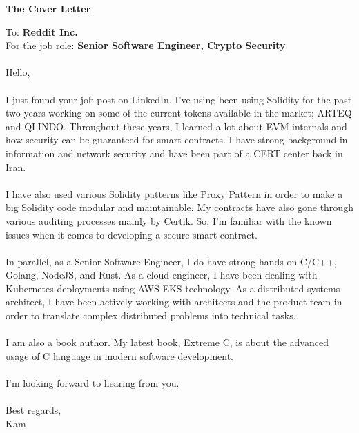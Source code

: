 \documentclass[10pt,a4paper]{article}
\begin{document}
\noindent \textbf{The Cover Letter}

\vspace{3cm}

\noindent To: \textbf{Reddit Inc.} \\
For the job role: \textbf{Senior Software Engineer, Crypto Security} \\ \\

\noindent Hello, \\ \\

\noindent I just found your job post on LinkedIn. I've using been using Solidity for the past two years working on some of the current tokens available in the market; ARTEQ and QLINDO. Throughout these years, I learned a lot about EVM internals and how security can be guaranteed for smart contracts. I have strong background in information and network security and have been part of a CERT center back in Iran. \\ \\

\noindent I have also used various Solidity patterns like Proxy Pattern in order to make a big Solidity code modular and maintainable. My contracts have also gone through various auditing processes mainly by Certik. So, I'm familiar with the known issues when it comes to developing a secure smart contract. \\ \\

\noindent In parallel, as a Senior Software Engineer, I do have strong hands-on C/C++, Golang, NodeJS, and Rust. As a cloud engineer, I have been dealing with Kubernetes deployments using AWS EKS technology. As a distributed systems architect, I have been actively working with architects and the product team in order to translate complex distributed problems into technical tasks. \\ \\

\noindent I am also a book author. My latest book, Extreme C, is about the advanced usage of C language in modern software development. \\ \\

\noindent I'm looking forward to hearing from you. \\ \\

\noindent Best regards, \\
\noindent Kam
\end{document}
